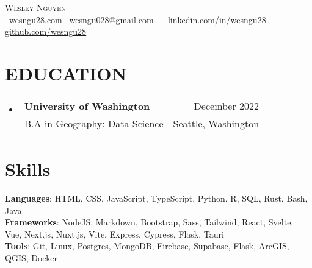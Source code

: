 \documentclass[letterpaper,11pt]{article}
\makeatletter
\newcommand{\resumeSubheading}[4]{
  \vspace{-2pt}\item
    \begin{tabular*}{0.97\textwidth}[t]{l@{\extracolsep{\fill}}r}
      \textbf{#1} & #2 \\
      {\small#3} & {\small #4} \\
    \end{tabular*}\vspace{-7pt}
}
\newcommand{\resumeSubHeadingListStart}{\begin{itemize}[leftmargin=0.15in, label={}]}
\newcommand{\resumeSubHeadingListEnd}{\end{itemize}}
\makeatother
\begin{document}

\begin{center}
    {\Huge \scshape Wesley Nguyen} \\ \vspace{4pt}\href{https://wesngu28.com}{\raisebox{-0.2\height}\ \underline{wesngu28.com}} {\raisebox{-0.2\height}\  \underline{wesngu028@gmail.com}} ~
    \href{https://linkedin.com/in/wesngu28/}{\raisebox{-0.2\height}\ \underline{linkedin.com/in/wesngu28}}  ~
    \href{https://github.com/wesngu28}{\raisebox{-0.2\height}\ \underline{ github.com/wesngu28}}
    \vspace{-8pt}
\end{center}


\section{EDUCATION}
  \resumeSubHeadingListStart
    \resumeSubheading
      {University of Washington}{December 2022}
      {B.A in Geography: Data Science}{Seattle, Washington}
  \resumeSubHeadingListEnd

\section{Skills}
 \begin{itemize}[leftmargin=0.15in, label={}]
    \small{\item{
     \textbf{Languages}{: HTML, CSS, JavaScript, TypeScript, Python, R, SQL, Rust, Bash, Java} \\
     \vspace{3pt}
     \textbf{Frameworks}{: NodeJS, Markdown, Bootstrap, Sass, Tailwind, React, Svelte, Vue, Next.js, Nuxt.js, Vite, Express, Cypress, Flask, Tauri} \\
     \vspace{3pt}
     \textbf{Tools}{: Git, Linux, Postgres, MongoDB, Firebase, Supabase, Flask, ArcGIS, QGIS, Docker} \\
    }}
 \end{itemize}
\end{document}
